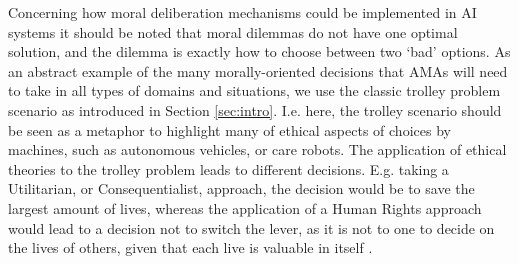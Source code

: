 \documentclass[twocolumn]{article}
\begin{document}
Concerning how moral deliberation mechanisms could be implemented in AI systems it should be noted that moral dilemmas do not have one optimal solution, and the dilemma is exactly how to choose between two `bad' options. As an abstract example of the many morally-oriented decisions that AMAs will need to take in all types of domains and situations, we use the classic trolley problem scenario as introduced in Section \ref{sec:intro}. %
I.e. here, the trolley scenario should be seen as a 
metaphor to highlight many of ethical aspects of choices by machines, such as autonomous vehicles, or care robots. 
The application of ethical theories to the trolley problem leads to different decisions. E.g. taking a Utilitarian, or Consequentialist, approach, the decision would be to save the largest amount of lives, whereas the application of a Human Rights approach would lead to a decision not to switch the lever, as it is not to one to decide on the lives of others, given that each live is valuable in itself \cite{PAPA:PAPA017}. 
\end{document}
